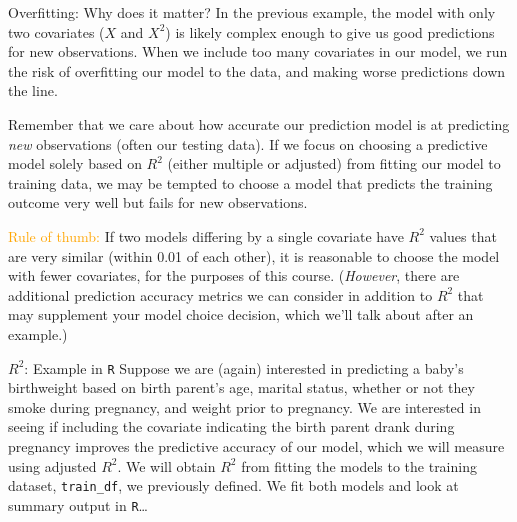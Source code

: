 \documentclass[10pt,t]{beamer}
\begin{document}
\begin{frame}{Overfitting: Why does it matter?}
	\vspace{-0.6cm}
In the previous example, the model with only two covariates ($X$ and $X^2$) is likely complex enough to give us good predictions for new observations. When we include too many covariates in our model, we run the risk of overfitting our model to the data, and making worse predictions down the line.

\vspace{0.3cm}

Remember that we care about how accurate our prediction model is at predicting \textit{new} observations (often our testing data). If we focus on choosing a predictive model solely based on $R^2$ (either multiple or adjusted) from fitting our model to training data, we may be tempted to choose a model that predicts the training outcome very well but fails for new observations.

\vspace{0.3cm}

\textcolor{orange}{Rule of thumb:} If two models differing by a single covariate have $R^2$ values that are very similar (within 0.01 of each other), it is reasonable to choose the model with fewer covariates, for the purposes of this course. \small (\textit{However}, there are additional prediction accuracy metrics we can consider in addition to $R^2$ that may supplement your model choice decision, which we'll talk about after an example.)
\end{frame}

\begin{frame}{$R^2$: Example in \texttt{R}}
Suppose we are (again) interested in predicting a baby's birthweight based on birth parent's age, marital status, whether or not they smoke during pregnancy, and weight prior to pregnancy. We are interested in seeing if including the covariate indicating the birth parent drank during pregnancy improves the predictive accuracy of our model, which we will measure using adjusted $R^2$. We will obtain $R^2$ from fitting the models to the training dataset, \texttt{train\_df}, we previously defined. We fit both models and look at summary output in \texttt{R}\dots


\end{frame}
\end{document}

